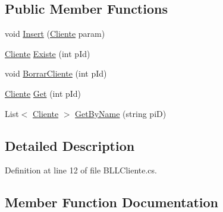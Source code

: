 \subsection*{Public Member Functions}
\begin{DoxyCompactItemize}
\item 
void \hyperlink{classprj_progra_i_i_i_1_1_layer_1_1_business___logic_1_1_b_l_l_cliente_a4412306e108649758d603cb510af7704}{Insert} (\hyperlink{classprj_progra_i_i_i_1_1_layer_1_1_entities_1_1_cliente}{Cliente} param)
\item 
\hyperlink{classprj_progra_i_i_i_1_1_layer_1_1_entities_1_1_cliente}{Cliente} \hyperlink{classprj_progra_i_i_i_1_1_layer_1_1_business___logic_1_1_b_l_l_cliente_a6a228925ac2fdaf460a0921a58a80df4}{Existe} (int p\+Id)
\item 
void \hyperlink{classprj_progra_i_i_i_1_1_layer_1_1_business___logic_1_1_b_l_l_cliente_a11c1c268ae9a534cb7a3ff7f46d66f3e}{Borrar\+Cliente} (int p\+Id)
\item 
\hyperlink{classprj_progra_i_i_i_1_1_layer_1_1_entities_1_1_cliente}{Cliente} \hyperlink{classprj_progra_i_i_i_1_1_layer_1_1_business___logic_1_1_b_l_l_cliente_abdfaa80f94058237b31fb8599bedd86c}{Get} (int p\+Id)
\item 
List$<$ \hyperlink{classprj_progra_i_i_i_1_1_layer_1_1_entities_1_1_cliente}{Cliente} $>$ \hyperlink{classprj_progra_i_i_i_1_1_layer_1_1_business___logic_1_1_b_l_l_cliente_a9963b076dc230773e81b866992a13a14}{Get\+By\+Name} (string piD)
\end{DoxyCompactItemize}


\subsection{Detailed Description}


Definition at line 12 of file B\+L\+L\+Cliente.\+cs.



\subsection{Member Function Documentation}
\hypertarget{classprj_progra_i_i_i_1_1_layer_1_1_business___logic_1_1_b_l_l_cliente_a11c1c268ae9a534cb7a3ff7f46d66f3e}{}\label{classprj_progra_i_i_i_1_1_layer_1_1_business___logic_1_1_b_l_l_cliente_a11c1c268ae9a534cb7a3ff7f46d66f3e} 
